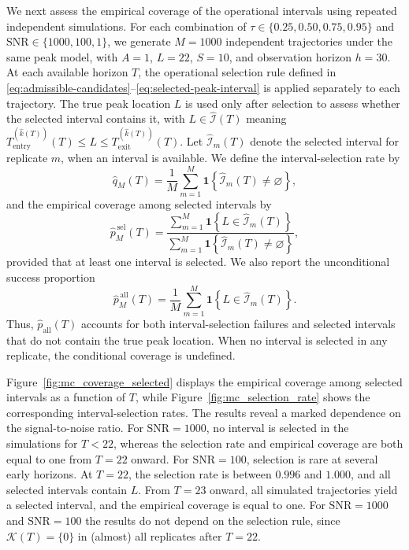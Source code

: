 \documentclass[12pt,a4paper]{article}
\begin{document}
We next assess the empirical coverage of the operational intervals using repeated independent simulations. For each combination of $\tau\in\{0.25,0.50,0.75,0.95\}$ and $\mathrm{SNR}\in\{1000,100,1\}$, we generate $M=1000$ independent trajectories under the same peak model, with $A=1$, $L=22$, $S=10$, and observation horizon $h=30$. At each available horizon $T$, the operational selection rule defined in \eqref{eq:admissible-candidates}--\eqref{eq:selected-peak-interval} is applied separately to each trajectory. The true peak location $L$ is used only after selection to assess whether the selected interval contains it, with
$L\in\widehat{\mathcal I}(T)$ meaning
$T_{\mathrm{entry}}^{(\widehat k(T))}(T)\le L\le T_{\mathrm{exit}}^{(\widehat k(T))}(T)$.
Let $\widehat{\mathcal I}_m(T)$ denote the selected interval for replicate $m$, when an interval is available. We define the interval-selection rate by
\[
\widehat q_M(T)
=
\frac{1}{M}
\sum_{m=1}^M
\mathbf 1\!\left\{
\widehat{\mathcal I}_m(T) \neq \varnothing
\right\},
\]
and the empirical coverage among selected intervals by
\[
\widehat p^{\,\mathrm{sel}}_M(T)
=
\frac{
	\displaystyle
	\sum_{m=1}^M
	\mathbf 1\!\left\{
	L \in \widehat{\mathcal I}_m(T)
	\right\}
}{
	\displaystyle
	\sum_{m=1}^M
	\mathbf 1\!\left\{
	\widehat{\mathcal I}_m(T) \neq \varnothing
	\right\}
},
\]
provided that at least one interval is selected. We also report the unconditional success proportion
\[
\widehat p^{\,\mathrm{all}}_M(T)
=
\frac{1}{M}
\sum_{m=1}^M
\mathbf 1\!\left\{
L \in \widehat{\mathcal I}_m(T)
\right\}.
\]
Thus, $\widehat p_{\mathrm{all}}(T)$ accounts for both interval-selection failures and selected intervals that do not contain the true peak location. When no interval is selected in any replicate, the conditional coverage is undefined.

Figure~\ref{fig:mc_coverage_selected} displays the empirical coverage among selected intervals as a function of $T$, while Figure~\ref{fig:mc_selection_rate} shows the corresponding interval-selection rates. The results reveal a marked dependence on the signal-to-noise ratio. For $\mathrm{SNR}=1000$, no interval is selected in the simulations for $T<22$, whereas the selection rate and empirical coverage are both equal to one from $T=22$ onward.
For $\mathrm{SNR}=100$, selection is rare at several early horizons. At
$T=22$, the selection rate is between $0.996$ and $1.000$, and all selected
intervals contain $L$. From $T=23$ onward, all simulated trajectories yield a
selected interval, and the empirical coverage is equal to one.
For $\mathrm{SNR}=1000$ and $\mathrm{SNR}=100$ the results do not depend on the selection rule, since $\mathcal K(T)=\{0\}$ in (almost) all replicates after $T=22$.
\end{document}
